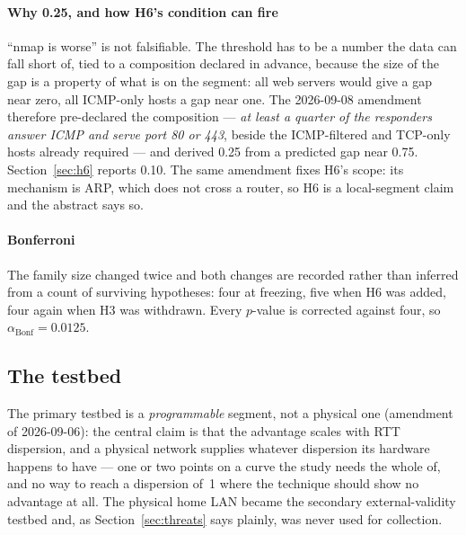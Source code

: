 \documentclass[conference]{IEEEtran}
\begin{document}
\paragraph*{Why 0.25, and how H6's condition can fire} ``nmap is worse'' is not
falsifiable. The threshold has to be a number the data can fall short of, tied
to a composition declared in advance, because the size of the gap is a property
of what is on the segment: all web servers would give a gap near zero, all
ICMP-only hosts a gap near one. The 2026-09-08 amendment therefore pre-declared
the composition --- \emph{at least a quarter of the responders answer ICMP and
serve port 80 or 443}, beside the ICMP-filtered and TCP-only hosts already
required --- and derived 0.25 from a predicted gap near 0.75.
Section~\ref{sec:h6} reports 0.10. The same amendment fixes H6's scope: its
mechanism is ARP, which does not cross a router, so H6 is a local-segment claim
and the abstract says so.

\paragraph*{Bonferroni} The family size changed twice and both changes are
recorded rather than inferred from a count of surviving hypotheses: four at
freezing, five when H6 was added, four again when H3 was withdrawn. Every
$p$-value is corrected against four, so $\alpha_{\mathrm{Bonf}}=0.0125$.

\subsection{The testbed}
\label{sec:testbed}

The primary testbed is a \emph{programmable} segment, not a physical one
(amendment of 2026-09-06): the central claim is that the advantage scales with
RTT dispersion, and a physical network supplies whatever dispersion its
hardware happens to have --- one or two points on a curve the study needs the
whole of, and no way to reach a dispersion of~1 where the technique should show
no advantage at all. The physical home LAN became the secondary
external-validity testbed and, as Section~\ref{sec:threats} says plainly, was
never used for collection.
\end{document}
